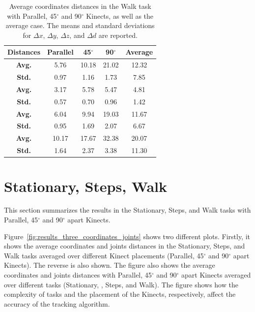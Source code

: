 \begin{table}[!h]
  \centering

  \begin{tabulary}{1.0\linewidth}{||c c c c c||} 
   \hline
   \textbf{Distances} & \textbf{Parallel} & \textbf{45$^{\circ}$} & \textbf{90$^{\circ}$} & \textbf{Average} \\ [0.5ex] 
   \hline\hline
   \textbf{Avg.}  & 5.76 & 10.18 & 21.02 & 12.32 \\
   \hline
   \textbf{Std.}  & 0.97 & 1.16 & 1.73 & 7.85 \\
   \hline
   \textbf{Avg.}  & 3.17 & 5.78 & 5.47 & 4.81 \\
   \hline
   \textbf{Std.}  & 0.57 & 0.70 & 0.96 & 1.42 \\
   \hline
   \textbf{Avg.}  & 6.04 & 9.94 & 19.03 & 11.67 \\
   \hline
   \textbf{Std.}  & 0.95 & 1.69 & 2.07 & 6.67 \\
   \hline
   \textbf{Avg.}  & 10.17 & 17.67 & 32.38 & 20.07 \\
   \hline
   \textbf{Std.}  & 1.64 & 2.37 & 3.38 & 11.30 \\
   \hline
  \end{tabulary}

  \caption{Average coordinates distances in the Walk task with Parallel, 45$^{\circ}$ and 90$^{\circ}$ Kinects, as well as the average case. The means and standard deviations for $\Delta x$, $\Delta y$, $\Delta z$, and $\Delta d$ are reported.}
  
  \label{table:walk_coordinates_values}
\end{table}

% 
% 
\section{Stationary, Steps, Walk}
\label{sec:results_stationary_steps_walk}

This section summarizes the results in the Stationary, Steps, and Walk tasks with Parallel, 45$^{\circ}$ and 90$^{\circ}$ apart Kinects. 

Figure~\ref{fig:results_three_coordinates_joints} shows two different plots. Firstly, it shows the average coordinates and joints distances in the Stationary, Steps, and Walk tasks averaged over different Kinect placements (Parallel, 45$^{\circ}$ and 90$^{\circ}$ apart Kinects). The reverse is also shown. The figure also shows the average coordinates and joints distances with Parallel, 45$^{\circ}$ and 90$^{\circ}$ apart Kinects averaged over different tasks (Stationary, , Steps, and Walk). The figure shows how the complexity of tasks and the placement of the Kinects, respectively, affect the accuracy of the tracking algorithm.

